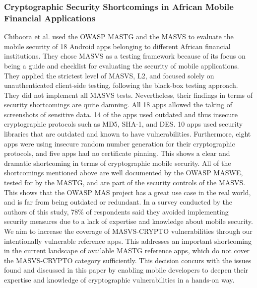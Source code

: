 \subsubsection{Cryptographic Security Shortcomings in African Mobile Financial Applications}
Chiboora et al. \citep{paper_07} used the OWASP MASTG and the MASVS to evaluate the mobile security of 18 Android apps belonging to different African financial institutions. They chose MASVS as a testing framework because of its focus on being a guide and checklist for evaluating the security of mobile applications. They applied the strictest level of MASVS, L2, and focused solely on unauthenticated client-side testing, following the black-box testing approach. They did not implement all MASVS tests. Nevertheless, their findings in terms of security shortcomings are quite damning. All 18 apps allowed the taking of screenshots of sensitive data. 14 of the apps used outdated and thus insecure cryptographic protocols such as MD5, SHA-1, and DES. 10 apps used security libraries that are outdated and known to have vulnerabilities. Furthermore, eight apps were using insecure random number generation for their cryptographic protocols, and five apps had no certificate pinning. This shows a clear and dramatic shortcoming in terms of cryptographic mobile security. All of the shortcomings mentioned above are well documented by the OWASP MASWE, tested for by the MASTG, and are part of the security controls of the MASVS. This shows that the OWASP MAS project has a great use case in the real world, and is far from being outdated or redundant. In a survey conducted by the authors of this study, 78\% of respondents said they avoided implementing security measures due to a lack of expertise and knowledge about mobile security. We aim to increase the coverage of MASVS-CRYPTO vulnerabilities through our intentionally vulnerable reference apps. This addresses an important shortcoming in the current landscape of available MASTG reference apps, which do not cover the MASVS-CRYPTO category sufficiently. This decision concurs with the issues found and discussed in this paper by enabling mobile developers to deepen their expertise and knowledge of cryptographic vulnerabilities in a hands-on way.

